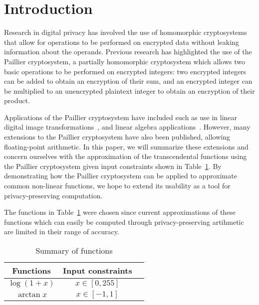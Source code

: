 \section{Introduction}
Research in digital privacy has involved the use of homomorphic cryptosystems that allow for operations to be performed on encrypted data without leaking information about the operands.
Previous research has highlighted the use of the Paillier cryptosystem, a partially homomorphic cryptosystem which allows two basic operations to be performed on encrypted integers: two encrypted integers can be added to obtain an encryption of their sum, and an encrypted integer can be multiplied to an unencrypted plaintext integer to obtain an encryption of their product.

Applications of the Paillier cryptosystem have included such as use in linear digital image transformations~\cite{ziad_cryptoimg:_2016}, and linear algebra applications~\cite{hutchison_privacy-preserving_2009}. However, many extensions to the Paillier cryptosystem have also been published, allowing floating-point arithmetic. In this paper, we will summarize these extensions and concern ourselves with the approximation of the transcendental functions using the Paillier cryptosystem given input constraints shown in Table~\ref{tab:inputconstraints}. By demonstrating how the Paillier cryptosystem can be applied to approximate common non-linear functions, we hope to extend its usability as a tool for privacy-preserving computation.

The functions in Table~\ref{tab:inputconstraints} were chosen since current approximations of these functions which can easily be computed through privacy-preserving artihmetic are limited in their range of accuracy.
\begin{table}
	\caption{Summary of functions}
	\label{tab:inputconstraints}
	\begin{tabular}{ccl}
		\toprule
		Functions & Input constraints\\
		\midrule
		$\log\left(1+x\right)$ & $x\in[0,255]$\\
		$\arctan x$ & $x\in[-1,1]$\\
	    \bottomrule
    \end{tabular}
\end{table}
